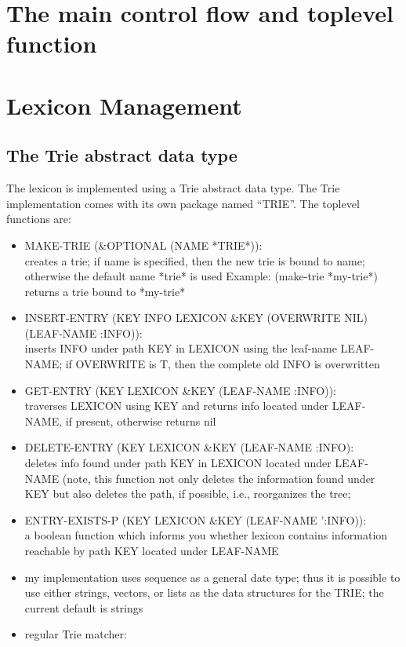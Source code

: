 \section{The main control flow and toplevel function}



\section{Lexicon Management}

\subsection{The Trie abstract data type}
The lexicon is implemented using a Trie abstract data type.
The Trie implementation comes with its own package named ``TRIE''. The
toplevel functions are:

\begin{itemize}
  
\item   MAKE-TRIE (\&OPTIONAL (NAME *TRIE*)):\\
        creates a trie; if name is specified, then the new trie is bound
        to name; otherwise the  default name *trie* is used
        Example: (make-trie *my-trie*) returns a trie bound  to *my-trie*

\item   INSERT-ENTRY (KEY INFO LEXICON \&KEY (OVERWRITE NIL) 
                                             (LEAF-NAME :INFO)):\\

        inserts INFO under path KEY in LEXICON using the leaf-name
        LEAF-NAME; if OVERWRITE is T, then the complete old INFO is 
        overwritten

\item   GET-ENTRY (KEY LEXICON \&KEY (LEAF-NAME :INFO)):\\
        traverses LEXICON using KEY and returns info located under LEAF-NAME,
        if present, otherwise returns nil
  
\item   DELETE-ENTRY (KEY LEXICON
		     \&KEY (LEAF-NAME :INFO):\\
        deletes info found under path KEY in LEXICON located under LEAF-NAME
        (note, this function not only deletes the information found under KEY
        but also deletes the path, if possible, i.e., reorganizes the tree;

\item   ENTRY-EXISTS-P (KEY LEXICON \&KEY (LEAF-NAME ':INFO)):\\
        a boolean function which informs you whether lexicon contains 
        information reachable by path KEY located under LEAF-NAME


\item   my implementation uses sequence as a general date type;
        thus it is possible to use either strings, vectors, or lists as 
        the data structures for the TRIE; the current default is
        strings

\item   regular Trie matcher:

\end{itemize}

